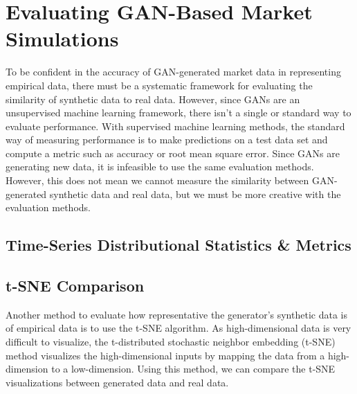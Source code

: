 \section{Evaluating GAN-Based Market Simulations}
To be confident in the accuracy of GAN-generated market data in representing empirical data, there must be a systematic framework for evaluating the similarity of synthetic data to real data. However, since GANs are an unsupervised machine learning framework, there isn't a single or standard way to evaluate performance. With supervised machine learning methods, the standard way of measuring performance is to make predictions on a test data set and compute a metric such as accuracy or root mean square error. Since GANs are generating new data, it is infeasible to use the same evaluation methods. However, this does not mean we cannot measure the similarity between GAN-generated synthetic data and real data, but we must be more creative with the evaluation methods.

\subsection{Time-Series Distributional Statistics \& Metrics}

\subsection{t-SNE Comparison}
Another method to evaluate how representative the generator's synthetic data is of empirical data is to use the t-SNE\cite{tsne} algorithm. As high-dimensional data is very difficult to visualize, the t-distributed stochastic neighbor embedding (t-SNE) method visualizes the high-dimensional inputs by mapping the data from a high-dimension to a low-dimension. Using this method, we can compare the t-SNE visualizations between generated data and real data.
